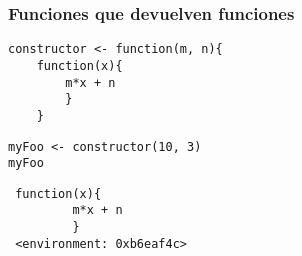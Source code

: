 \documentclass[xcolor={usenames,svgnames,dvipsnames}]{beamer}
\begin{document}
\begin{frame}[fragile]
\frametitle{Funciones que devuelven funciones}
\label{sec-2-5}


\lstset{language=R}
\begin{lstlisting}
constructor <- function(m, n){
    function(x){
        m*x + n
        }
    }
\end{lstlisting}



\lstset{language=R}
\begin{lstlisting}
myFoo <- constructor(10, 3)
myFoo
\end{lstlisting}

\begin{verbatim}
 function(x){
         m*x + n
         }
 <environment: 0xb6eaf4c>
\end{verbatim}
\end{frame}
\end{document}
